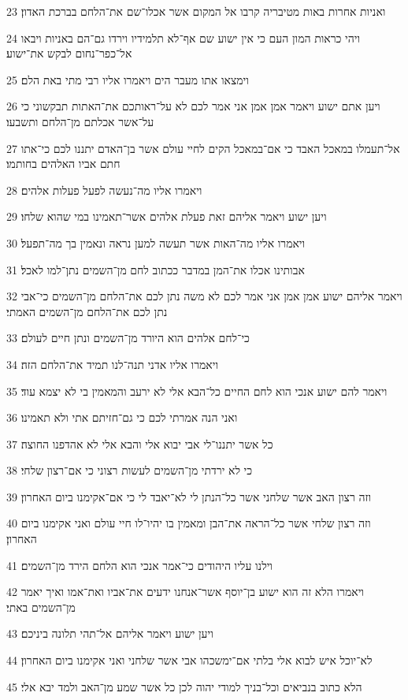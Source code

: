 \par 23 ואניות אחרות באות מטיבריה קרבו אל המקום אשר אכלו־שם את־הלחם בברכת האדון׃
\par 24 ויהי כראות המון העם כי אין ישוע שם אף־לא תלמידיו וירדו גם־הם באניות ויבאו אל־כפר־נחום לבקש את־ישוע׃
\par 25 וימצאו אתו מעבר הים ויאמרו אליו רבי מתי באת הלם׃
\par 26 ויען אתם ישוע ויאמר אמן אמן אני אמר לכם לא על־ראותכם את־האתות תבקשוני כי על־אשר אכלתם מן־הלחם ותשבעו׃
\par 27 אל־תעמלו במאכל האבד כי אם־במאכל הקים לחיי עולם אשר בן־האדם יתננו לכם כי־אתו חתם אביו האלהים בחותמו׃
\par 28 ויאמרו אליו מה־נעשה לפעל פעלות אלהים׃
\par 29 ויען ישוע ויאמר אליהם זאת פעלת אלהים אשר־תאמינו במי שהוא שלחו׃
\par 30 ויאמרו אליו מה־האות אשר תעשה למען נראה ונאמין בך מה־תפעל׃
\par 31 אבותינו אכלו את־המן במדבר ככתוב לחם מן־השמים נתן־למו לאכל׃
\par 32 ויאמר אליהם ישוע אמן אמן אני אמר לכם לא משה נתן לכם את־הלחם מן־השמים כי־אבי נתן לכם את־הלחם מן־השמים האמתי׃
\par 33 כי־לחם אלהים הוא היורד מן־השמים ונתן חיים לעולם׃
\par 34 ויאמרו אליו אדני תנה־לנו תמיד את־הלחם הזה׃
\par 35 ויאמר להם ישוע אנכי הוא לחם החיים כל־הבא אלי לא ירעב והמאמין בי לא יצמא עוד׃
\par 36 ואני הנה אמרתי לכם כי גם־חזיתם אתי ולא תאמינו׃
\par 37 כל אשר יתננו־לי אבי יבוא אלי והבא אלי לא אהדפנו החוצה׃
\par 38 כי לא ירדתי מן־השמים לעשות רצוני כי אם־רצון שלחי׃
\par 39 וזה רצון האב אשר שלחני אשר כל־הנתן לי לא־יאבד לי כי אם־אקימנו ביום האחרון׃
\par 40 וזה רצון שלחי אשר כל־הראה את־הבן ומאמין בו יהיו־לו חיי עולם ואני אקימנו ביום האחרון׃
\par 41 וילנו עליו היהודים כי־אמר אנכי הוא הלחם הירד מן־השמים׃
\par 42 ויאמרו הלא זה הוא ישוע בן־יוסף אשר־אנחנו ידעים את־אביו ואת־אמו ואיך יאמר מן־השמים באתי׃
\par 43 ויען ישוע ויאמר אליהם אל־תהי תלונה ביניכם׃
\par 44 לא־יוכל איש לבוא אלי בלתי אם־ימשכהו אבי אשר שלחני ואני אקימנו ביום האחרון׃
\par 45 הלא כתוב בנביאים וכל־בניך למודי יהוה לכן כל אשר שמע מן־האב ולמד יבא אלי׃
